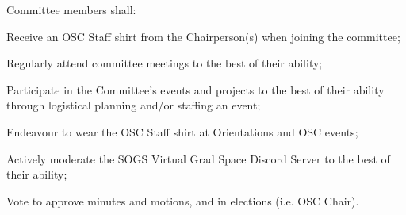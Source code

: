 \begin{longenum}[ label*=\thesubsection.\arabic*., align=left]
\begin{longenum}[label*=\arabic*., align=left]
\begin{longenum}[label*=\arabic*., align=left]
			\end{longenum}	
		\item Committee members shall:
			\begin{longenum}[label*=\arabic*., align=left]
			\item Receive an OSC Staff shirt from the Chairperson(s) when joining the committee;
			\item Regularly attend committee meetings to the best of their ability;
			\item Participate in the Committee's events and projects to the best of their ability through logistical planning and/or staffing an event;
			\item Endeavour to wear the OSC Staff shirt at Orientations and OSC events;
			\item Actively moderate the SOGS Virtual Grad Space Discord Server to the best of their ability;
			\item Vote to approve minutes and motions, and in elections (i.e. OSC Chair).			 			
			\end{longenum}	
		\end{longenum}
\end{longenum}
	
